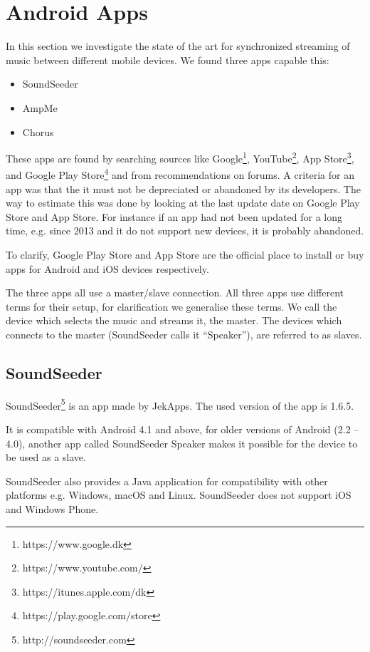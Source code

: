 \section{Android Apps}\label{sec:sota_apps}
In this section we investigate the state of the art for synchronized streaming of music between different mobile devices.
We found three apps capable this:
\begin{itemize}
    \item SoundSeeder
    \item AmpMe
    \item Chorus
\end{itemize}

These apps are found by searching sources like Google\footnote{https://www.google.dk}, YouTube\footnote{https://www.youtube.com/}, App Store\footnote{https://itunes.apple.com/dk}, and Google Play Store\footnote{https://play.google.com/store} and from recommendations on forums. 
A criteria for an app was that the it must not be depreciated or abandoned by its developers.
The way to estimate this was done by looking at the last update date on Google Play Store and App Store.
For instance if an app had not been updated for a long time, e.g. since 2013 and it do not support new devices, it is probably abandoned.

To clarify, Google Play Store and App Store are the official place to install or buy apps for Android and iOS devices respectively.

The three apps all use a master/slave connection.
All three apps use different terms for their setup, for clarification we generalise these terms. 
We call the device which selects the music and streams it, the master.
The devices which connects to the master (SoundSeeder calls it ``Speaker''), are referred to as slaves.

\subsection{SoundSeeder}\label{subsec:soundseeder}
SoundSeeder\footnote{http://soundseeder.com} is an app made by JekApps. 
The used version of the app is 1.6.5.

It is compatible with Android 4.1 and above, for older versions of Android (2.2 -- 4.0),
another app called SoundSeeder Speaker makes it possible for the device to be used as a slave.

SoundSeeder also provides a Java application for compatibility with other platforms e.g. Windows, macOS and Linux.
SoundSeeder does not support iOS and Windows Phone\cite{soundseeder_ios}.

